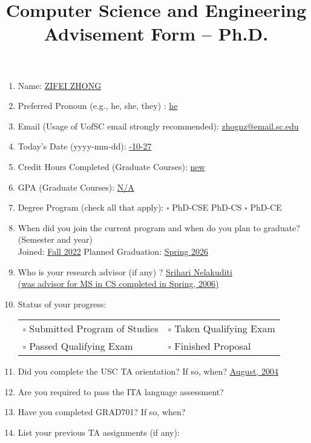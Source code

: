\documentclass[11pt, oneside]{article}   	%
\title{Computer Science and Engineering Advisement Form -- Ph.D.}
\date{}							%
\begin{document}
\maketitle

\begin{enumerate}
\item Name: \underline{\quad ZIFEI ZHONG \quad}
\item Preferred Pronoun (e.g., he, she, they) : \underline{\quad he \quad}
\item Email (Usage of UofSC email strongly recommended): \underline{\quad zhognz@email.sc.edu \quad}
\item Today's Date (yyyy-mm-dd): \underline{-10-27 \quad}
\item Credit Hours Completed (Graduate Courses): \underline{\quad new \quad}
\item GPA (Graduate Courses): \underline{\quad N/A \quad}
\item Degree Program (check all that apply): $\square$ PhD-CSE \quad \makebox[0pt][l]{$\square$}\raisebox{.15ex}{\hspace{0.1em}$\checkmark$}  PhD-CS \quad $\square$ PhD-CE
\item When did you join the current program and when do you plan to graduate? (Semester and year)\\
 Joined: \underline{\quad Fall 2022\quad } \qquad Planned Graduation: \underline{\quad Spring 2026\quad}
\item Who is your research advisor (if any) ? \underline{\quad Srihari Nelakuditi \quad }\\
\underline{\quad (was advisor for MS in CS completed in Spring, 2006) \quad}
\item Status of your progress:\\
\begin{tabular}{l l}
$\square$ Submitted Program of Studies & $\square$ Taken Qualifying Exam\\
$\square$ Passed Qualifying Exam & $\square$ Finished Proposal
\end{tabular}
\item Did you complete the USC TA orientation? If so, when? \underline{\qquad August, 2004\qquad}
\item Are you required to pass the ITA language assessment? \underline{\qquad\qquad}
\item Have you completed GRAD701? If so, when? \underline{\qquad\qquad}
\item List your previous TA assignments (if any): 


\end{enumerate}
\end{document}
